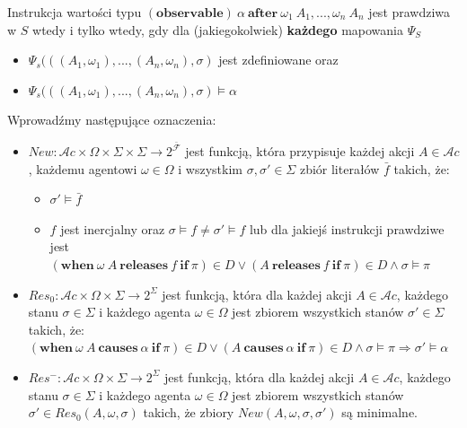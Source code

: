 \documentclass[11pt,a4paper]{article}
\begin{document}
    Instrukcja wartości typu $(\mathbf{observable})~\alpha~\mathbf{after}~\omega_1~A_1,...,\omega_n~A_n$ jest prawdziwa w $S$ wtedy i tylko wtedy, gdy dla (jakiegokolwiek) \textbf{każdego} mapowania $\Psi_S$
    \begin{itemize}
        \item $\Psi_s(((A_1, \omega_1), ..., (A_n, \omega_n), \sigma)$ jest zdefiniowane oraz 
        \item $\Psi_s(((A_1, \omega_1), ..., (A_n, \omega_n), \sigma) \models \alpha$
    \end{itemize}
    
    Wprowadźmy następujące oznaczenia:
    \begin{itemize}
        \item $New: \mathcal{A}c \times \Omega \times \Sigma \times \Sigma \rightarrow 2^{\bar{\mathcal{F}}}$ jest funkcją, która przypisuje każdej akcji $A \in \mathcal{A}c$, każdemu agentowi $\omega \in \Omega$ i wszystkim $\sigma, \sigma' \in \Sigma$ zbiór literałów $\bar{f}$ takich, że:
        \begin{itemize}
            \item $\sigma' \models \bar{f}$
            \item $f$ jest inercjalny oraz $\sigma \models f \neq \sigma' \models f$ lub
            dla jakiejś instrukcji prawdziwe jest\\$(\mathbf{when}~\omega~A~\mathbf{releases}~f~\mathbf{if}~\pi) \in D \vee (A~\mathbf{releases}~f~\mathbf{if}~\pi) \in D \wedge \sigma \models \pi$
        \end{itemize}
        
        \item $Res_0: \mathcal{A}c \times \Omega \times \Sigma \rightarrow 2^\Sigma$ jest funkcją, która dla każdej akcji $A \in \mathcal{A}c$, każdego stanu $\sigma \in \Sigma$ i każdego agenta $\omega \in \Omega$ jest zbiorem wszystkich stanów $\sigma' \in \Sigma$ takich, że:\\
        $(\mathbf{when}~\omega~A~\mathbf{causes}~\alpha~\mathbf{if}~\pi) \in D \vee (A~\mathbf{causes}~\alpha~\mathbf{if}~\pi) \in D \wedge \sigma \models \pi \Rightarrow \sigma' \models \alpha$

        \item $Res^-: \mathcal{A}c \times \Omega \times \Sigma \rightarrow 2^\Sigma$ jest funkcją, która dla każdej akcji $A \in \mathcal{A}c$, każdego stanu $\sigma \in \Sigma$ i każdego agenta $\omega \in \Omega$ jest zbiorem wszystkich stanów $\sigma' \in Res_0(A, \omega, \sigma)$ takich, że zbiory $New(A, \omega, \sigma, \sigma')$ są minimalne.
        

\end{itemize}
\end{document}
